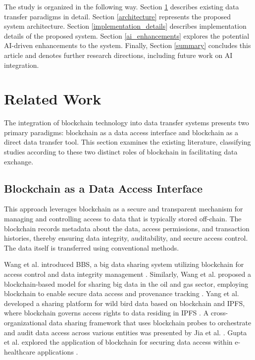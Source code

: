 \documentclass[10pt]{llncs}
\begin{document}
The study is organized in the following way.
Section \ref{related_work} describes existing data transfer paradigms in detail.
Section \ref{architecture} represents the proposed system architecture.
Section \ref{implementation_details} describes implementation details of the proposed system.
Section \ref{ai_enhancements} explores the potential AI-driven enhancements to the system.
Finally, Section \ref{summary} concludes this article and denotes further research directions, including future work on AI integration.

\section{Related Work} \label{related_work}

The integration of blockchain technology into data transfer systems presents two primary paradigms: blockchain as a data access interface and blockchain as a direct data transfer tool.
This section examines the existing literature, classifying studies according to these two distinct roles of blockchain in facilitating data exchange.

\subsection{Blockchain as a Data Access Interface}

This approach leverages blockchain as a secure and transparent mechanism for managing and controlling access to data that is typically stored off-chain.
The blockchain records metadata about the data, access permissions, and transaction histories, thereby ensuring data integrity, auditability, and secure access control.
The data itself is transferred using conventional methods.

Wang et al. introduced BBS, a big data sharing system utilizing blockchain for access control and data integrity management \cite{Wang2024}.
Similarly, Wang et al. proposed a blockchain-based model for sharing big data in the oil and gas sector, employing blockchain to enable secure data access and provenance tracking \cite{WangYY2021}.
Yang et al. developed a sharing platform for wild bird data based on blockchain and IPFS, where blockchain governs access rights to data residing in IPFS \cite{Yang2022}.
A cross-organizational data sharing framework that uses blockchain probes to orchestrate and audit data access across various entities was presented by Jia et al. \cite{Jia2023}.
Gupta et al. explored the application of blockchain for securing data access within e-healthcare applications \cite{Gupta2022}.
\end{document}
